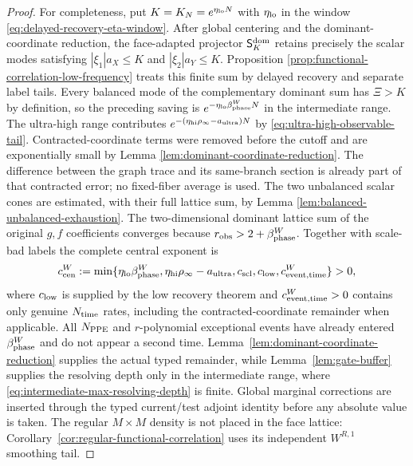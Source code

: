 \documentclass[11pt]{article}
\begin{document}
\begin{proof}
For completeness, put $K=K_N=e^{\eta_{\rm lo}N}$ with
$\eta_{\rm lo}$ in the window
\eqref{eq:delayed-recovery-eta-window}.  After global centering and the
dominant-coordinate reduction, the face-adapted projector
$\mathsf S_K^{\rm dom}$ retains precisely the scalar modes satisfying
$|\xi_1|a_X\le K$ and $|\xi_2|a_Y\le K$.  Proposition
\ref{prop:functional-correlation-low-frequency} treats this finite sum by
delayed recovery and separate label tails.  Every balanced mode of the complementary dominant
sum has $\Xi>K$ by definition, so the preceding saving is
$e^{-\eta_{\rm lo}\beta_{\rm phase}^{W}N}$ in the intermediate range.  The
ultra-high range contributes
$e^{-(\eta_{\rm hi}\rho_\infty-a_{\rm ultra})N}$ by
\eqref{eq:ultra-high-observable-tail}.  Contracted-coordinate terms were removed before
the cutoff and are exponentially small by Lemma
\ref{lem:dominant-coordinate-reduction}.  The difference between the graph
trace and its same-branch section is already part of that contracted error;
no fixed-fiber average is used.  The two unbalanced scalar cones are
estimated, with their full lattice sum, by Lemma
\ref{lem:balanced-unbalanced-exhaustion}.  The two-dimensional dominant
lattice sum of the original $g,f$ coefficients converges because
\(r_{\rm obs}>2+\beta_{\rm phase}^{W}\).  Together with scale-bad labels the
complete central exponent is
\begin{equation}
\label{eq:complete-central-exponent}
 c_{\rm cen}^{W}:=\min\{\eta_{\rm lo}\beta_{\rm phase}^{W},
 \eta_{\rm hi}\rho_\infty-a_{\rm ultra},c_{\rm scl},
 c_{\rm low},c_{\rm event,time}^{W}\}>0,
\end{equation}
where $c_{\rm low}$ is supplied by the low recovery theorem and
$c_{\rm event,time}^{W}>0$ contains only genuine $N_{\rm time}$ rates,
including the contracted-coordinate remainder when applicable.  All
$N_{\rm PPE}$ and $r$-polynomial exceptional events have already entered
$\beta_{\rm phase}^{W}$ and do not appear a second time.
Lemma~\ref{lem:dominant-coordinate-reduction} supplies the actual typed
remainder, while Lemma~\ref{lem:gate-buffer} supplies the
resolving depth only in the intermediate range, where
\eqref{eq:intermediate-max-resolving-depth} is finite.  Global marginal corrections are inserted through the typed
current/test adjoint identity before any absolute value is taken.  The
regular $M\times M$ density is not placed in the face lattice:
Corollary~\ref{cor:regular-functional-correlation} uses its independent
$W^{R,1}$ smoothing tail.
\end{proof}
\end{document}
